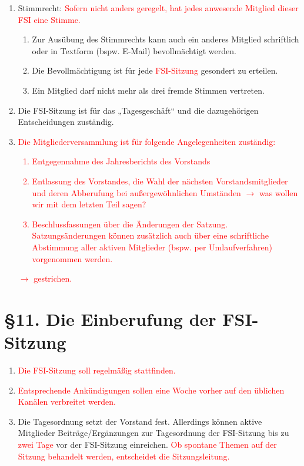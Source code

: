 \documentclass[a4paper,12pt]{article}
\newcommand{\red}[1]{\textcolor{red}{#1}}
\begin{document}
\begin{enumerate}
	\item
		\label{10.1_Stimmrecht}
		Stimmrecht: \red{Sofern nicht anders geregelt, hat jedes
		anwesende Mitglied dieser FSI eine Stimme.}
		\begin{enumerate}[label=(\roman*)]
        		\item
				Zur Ausübung des Stimmrechts kann auch ein
				anderes Mitglied schriftlich oder in Textform
				(bspw. E-Mail) bevollmächtigt werden.
        		\item
				Die Bevollmächtigung ist für jede
				\red{FSI-Sitzung} gesondert zu erteilen.
        		\item
				Ein Mitglied darf nicht mehr als drei
				fremde Stimmen vertreten.
    		\end{enumerate}
    	\item
		Die FSI-Sitzung ist für das „Tagesgeschäft“ und die
		dazugehörigen Entscheidungen zuständig.
    	\item
		\red{
		Die Mitgliederversammlung ist für folgende Angelegenheiten
		zuständig:
		\begin{enumerate}[label=(\roman*)]
			\item
				Entgegennahme des Jahresberichts des Vorstands
			\item
				Entlassung des Vorstandes, die Wahl der \red{nächsten Vorstandsmitglieder}
				und deren Abberufung bei außergewöhnlichen
				Umständen \red{$\rightarrow$ was wollen wir mit dem letzten Teil sagen?}
			\item
				Beschlussfassungen über die Änderungen der
				Satzung. Satzungsänderungen können zusätzlich
				auch über eine schriftliche Abstimmung aller
				aktiven Mitglieder (bspw. per Umlaufverfahren)
				vorgenommen werden.
		\end{enumerate}
	$\rightarrow$ gestrichen.}
\end{enumerate}

\section*{§11. Die Einberufung der FSI-Sitzung}

\begin{enumerate}
	\item
		\red{Die FSI-Sitzung soll regelmäßig stattfinden.}
	\item
		\red{Entsprechende Ankündigungen sollen eine Woche vorher auf den
		üblichen Kanälen verbreitet werden.}
    	\item
		Die Tagesordnung setzt der Vorstand fest. Allerdings können
		aktive Mitglieder Beiträge/Ergänzungen zur Tagesordnung der
		FSI-Sitzung bis zu \red{zwei Tage} vor der
		FSI-Sitzung einreichen. \red{Ob spontane Themen auf der
		Sitzung behandelt werden, entscheidet die Sitzungsleitung.}
\end{enumerate}
\end{document}
